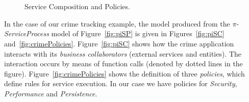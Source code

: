 \begin{figure}[t]
\centering
{}
~ %
\\[-1mm]
~ %
\caption{Service Composition and Policies.}
\label{fig:policies}
\end{figure}

In the case of our crime tracking example, the model produced from the $\pi$-\textit{ServiceProcess} model of Figure~\ref{fig:piSP} is given in Figures~\ref{fig:piSC} and~\ref{fig:crimePolicies}.
Figure~\ref{fig:piSC} shows how the crime application interacts with its \textit{business collaborators} (external services and entities).
The interaction occurs by means of function calls (denoted by dotted lines in the figure).
Figure~\ref{fig:crimePolicies} shows the definition of three \textit{policies}, which define rules for service execution.
In our case we have policies for \textit{Security}, \textit{Performance} and \textit{Persistence}. 


